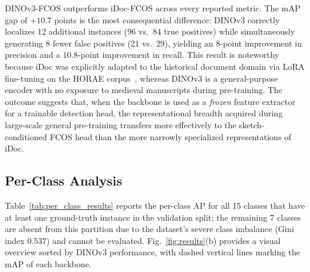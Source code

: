 \documentclass{iopjournal}
\begin{document}
DINOv3-FCOS outperforms iDoc-FCOS across every reported metric.
The mAP gap of $+10.7$ points is the most consequential difference: DINOv3
correctly localizes 12 additional instances (96 vs.\ 84 true positives) while
simultaneously generating 8 fewer false positives (21 vs.\ 29), yielding an
$8$-point improvement in precision and a $10.8$-point improvement in recall.
This result is noteworthy because iDoc was explicitly adapted to the historical
document domain via LoRA fine-tuning on the HORAE corpus~\cite{saavedra2024idoc},
whereas DINOv3 is a general-purpose encoder with no exposure to medieval
manuscripts during pre-training.
The outcome suggests that, when the backbone is used as a \emph{frozen} feature
extractor for a trainable detection head, the representational breadth acquired
during large-scale general pre-training transfers more effectively to the
sketch-conditioned FCOS head than the more narrowly specialized representations
of iDoc.

\subsection{Per-Class Analysis}

Table~\ref{tab:per_class_results} reports the per-class AP for all 15 classes
that have at least one ground-truth instance in the validation split; the
remaining 7 classes are absent from this partition due to the dataset's severe
class imbalance (Gini index $0.537$) and cannot be evaluated.
Fig.~\ref{fig:results}(b) provides a visual overview sorted by DINOv3
performance, with dashed vertical lines marking the mAP of each backbone.
\end{document}
